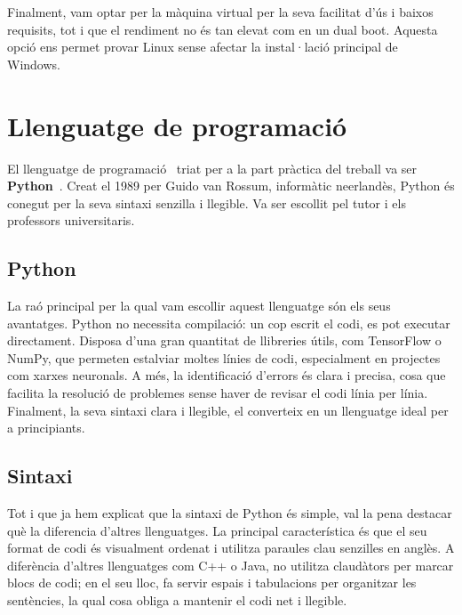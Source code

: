 Finalment, vam optar per la màquina virtual per la seva facilitat d’ús i baixos requisits, tot i que el rendiment no és tan elevat com en un dual boot. Aquesta opció ens permet provar Linux sense afectar la instal·lació principal de Windows.

\section{Llenguatge de programació}\label{sec:4.4}
El llenguatge de programació~\cite{LlenguatgeDeProgramacio} triat per a la part pràctica del treball va ser \textbf{Python}~\cite{Python}. Creat el 1989 per Guido van Rossum, informàtic neerlandès, Python és conegut per la seva sintaxi senzilla i llegible.
Va ser escollit pel tutor i els professors universitaris.

\subsection{Python}
La raó principal per la qual vam escollir aquest llenguatge són els seus avantatges. Python no necessita compilació: un cop escrit el codi, es pot executar directament. Disposa d’una gran quantitat de llibreries útils, com TensorFlow o NumPy, que permeten estalviar moltes línies de codi, especialment en projectes com xarxes neuronals. A més, la identificació d’errors és clara i precisa, cosa que facilita la resolució de problemes sense haver de revisar el codi línia per línia. Finalment, la seva sintaxi clara i llegible, el converteix en un llenguatge ideal per a principiants.
\subsection{Sintaxi}
Tot i que ja hem explicat que la sintaxi de Python és simple, val la pena destacar què la diferencia d’altres llenguatges. La principal característica és que el seu format de codi és visualment ordenat i utilitza paraules clau senzilles en anglès. A diferència d’altres llenguatges com C++ o Java, no utilitza claudàtors per marcar blocs de codi; en el seu lloc, fa servir espais i tabulacions per organitzar les sentències, la qual cosa obliga a mantenir el codi net i llegible.

